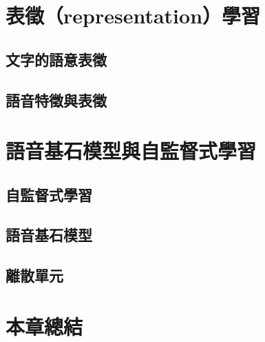 \section{表徵（representation）學習}

\subsection{文字的語意表徵}



\subsection{語音特徵與表徵}


\section{語音基石模型與自監督式學習}

\subsection{自監督式學習}

\subsection{語音基石模型}

\subsection{離散單元}


\section{本章總結}


